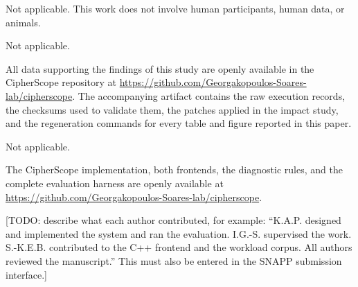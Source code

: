 \documentclass[pdflatex,sn-basic,Numbered,iicol]{sn-jnl}
\newcommand{\todo}[1]{\textcolor{red!75!black}{[TODO: #1]}}
\begin{document}
Not applicable. This work does not involve human participants, human data, or
animals.


Not applicable.


All data supporting the findings of this study are openly available in the
CipherScope repository at
\url{https://github.com/Georgakopoulos-Soares-lab/cipherscope}. The
accompanying artifact contains the raw execution records, the checksums used
to validate them, the patches applied in the impact study, and the
regeneration commands for every table and figure reported in this paper.


Not applicable.


The CipherScope implementation, both frontends, the diagnostic rules, and the
complete evaluation harness are openly available at
\url{https://github.com/Georgakopoulos-Soares-lab/cipherscope}.


\todo{describe what each author contributed, for example: ``K.A.P. designed
and implemented the system and ran the evaluation. I.G.-S. supervised the
work. S.-K.E.B. contributed to the C++ frontend and the workload corpus. All
authors reviewed the manuscript.'' This must also be entered in the SNAPP
submission interface.}


\end{document}
